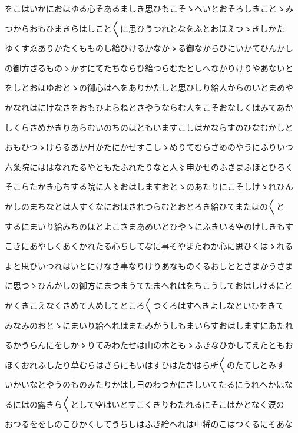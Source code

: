 \documentclass[a4paper,11pt,landscape]{ltjtarticle}
\begin{document}
をこはいかにおほゆる心そあるましき思ひもこそゝへいとおそろしきことゝみ
\par\medskip
つからおもひまきらはしこと〱に思ひうつれとなをふとおほえつゝきしかた
\par\medskip
ゆくすゑありかたくもものし給ひけるかなかゝる御なからひにいかてひんかし
\par\medskip
の御方さるものゝかすにてたちならひ給つらむたとしへなかりけりやあないと
\par\medskip
をしとおほゆおとゝの御心はへをありかたしと思ひしり給人からのいとまめや
\par\medskip
かなれはにけなさをおもひよらねとさやうならむ人をこそおなしくはみてあか
\par\medskip
しくらさめかきりあらむいのちのほともいますこしはかならすのひなむかしと
\par\medskip
おもひつゝけらるあか月かたにかせすこしゝめりてむらさめのやうにふりいつ
\par\medskip
六条院にははなれたるやともたふれたりなと人〻申かせのふきまふほとひろく
\par\medskip
そこらたかき心ちする院に人〻おはしますおとゝのあたりにこそしけゝれひん
\par\medskip
かしのまちなとは人すくなにおほされつらむとおとろき給ひてまたほの〱と
\par\medskip
するにまいり給みちのほとよこさまあめいとひやゝにふきいる空のけしきもす
\par\medskip
こきにあやしくあくかれたる心ちしてなに事そやまたわか心に思ひくはゝれる
\par\medskip
よと思ひいつれはいとにけなき事なりけりあなものくるおしととさまかうさま
\par\medskip
に思つゝひんかしの御方にまつまうてたまへれはをちこうしておはしけるにと
\par\medskip
かくきこえなくさめて人めしてところ〱つくろはすへきよしなといひをきて
\par\medskip
みなみのおとゝにまいり給へれはまたみかうしもまいらすおはしますにあたれ
\par\medskip
るかうらんにをしかゝりてみわたせは山の木ともゝふきなひかしてえたともお
\par\medskip
ほくおれふしたり草むらはさらにもいはすひはたかはら所〱のたてしとみす
\par\medskip
いかいなとやうのものみたりかはし日のわつかにさしいてたるにうれへかほな
\par\medskip
るにはの露きら〱として空はいとすこくきりわたれるにそこはかとなく涙の
\par\medskip
おつるををしのこひかくしてうちしはふき給へれは中将のこはつくるにそあな
\end{document}
